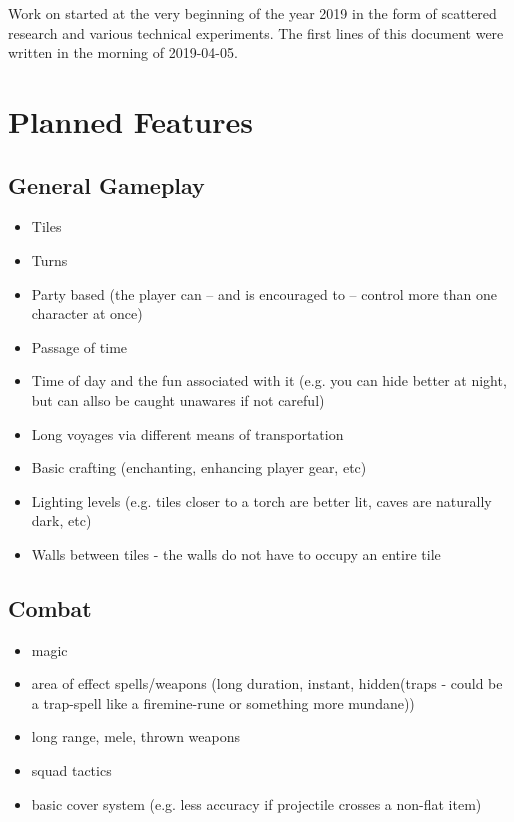 \documentclass[a4paper,10pt]{book}
\begin{document}
Work on \Projectname{} started at the very beginning of the year 2019 in the
form of scattered research and various technical experiments. The first lines of
this document were written in the morning of 2019-04-05.

\section{Planned Features}
\subsection{General Gameplay}
\begin{itemize}
  \item Tiles
  \item Turns
  \item Party based (the player can -- and is encouraged to -- control more
    than one character at once)
  \item Passage of time
  \item Time of day and the fun associated with it (e.g. you can hide better at
    night, but can allso be caught unawares if not careful)
  \item Long voyages via different means of transportation
  \item Basic crafting (enchanting, enhancing player gear, etc)
  \item Lighting levels (e.g. tiles closer to a torch are better lit, caves
    are naturally dark, etc)
  \item Walls between tiles - the walls do not have to occupy an entire tile
\end{itemize}

\subsection{Combat}
\begin{itemize}
  \item magic
  \item area of effect spells/weapons (long duration, instant, hidden(traps -
    could be a trap-spell like a firemine-rune or something more mundane))
  \item long range, mele, thrown weapons
  \item squad tactics
  \item basic cover system (e.g. less accuracy if projectile crosses a non-flat
    item)
\end{itemize}
\end{document}
